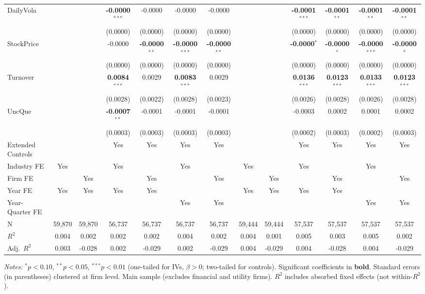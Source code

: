 \begin{landscape}
\begin{table}[H]
\begin{tabular}{lcccccccccccc}
DailyVola &  &  & \textbf{-0.0000}$^{***}$ & -0.0000 & -0.0000 & -0.0000 &  &  & \textbf{-0.0001}$^{***}$ & \textbf{-0.0001}$^{**}$ & \textbf{-0.0001}$^{**}$ & \textbf{-0.0001}$^{**}$ \\
 &  &  & (0.0000) & (0.0000) & (0.0000) & (0.0000) &  &  & (0.0000) & (0.0000) & (0.0000) & (0.0000) \\
StockPrice &  &  & -0.0000 & \textbf{-0.0000}$^{**}$ & \textbf{-0.0000}$^{***}$ & \textbf{-0.0000}$^{**}$ &  &  & \textbf{-0.0000}$^{*}$ & \textbf{-0.0000}$^{*}$ & \textbf{-0.0000}$^{***}$ & \textbf{-0.0000}$^{*}$ \\
 &  &  & (0.0000) & (0.0000) & (0.0000) & (0.0000) &  &  & (0.0000) & (0.0000) & (0.0000) & (0.0000) \\
Turnover &  &  & \textbf{0.0084}$^{***}$ & 0.0029 & \textbf{0.0083}$^{***}$ & 0.0029 &  &  & \textbf{0.0136}$^{***}$ & \textbf{0.0123}$^{***}$ & \textbf{0.0133}$^{***}$ & \textbf{0.0123}$^{***}$ \\
 &  &  & (0.0028) & (0.0022) & (0.0028) & (0.0023) &  &  & (0.0026) & (0.0028) & (0.0026) & (0.0028) \\
UncQue &  &  & \textbf{-0.0007}$^{**}$ & -0.0001 & -0.0001 & -0.0001 &  &  & -0.0003 & 0.0002 & 0.0001 & 0.0002 \\
 &  &  & (0.0003) & (0.0003) & (0.0003) & (0.0003) &  &  & (0.0002) & (0.0003) & (0.0002) & (0.0003) \\
\midrule
Extended Controls &  &  & Yes & Yes & Yes & Yes &  &  & Yes & Yes & Yes & Yes \\
Industry FE & Yes &  & Yes &  & Yes &  & Yes &  & Yes &  & Yes &  \\
Firm FE &  & Yes &  & Yes &  & Yes &  & Yes &  & Yes &  & Yes \\
Year FE & Yes & Yes & Yes & Yes &  &  & Yes & Yes & Yes & Yes &  &  \\
Year-Quarter FE &  &  &  &  & Yes & Yes &  &  &  &  & Yes & Yes \\
\midrule
N & 59,870 & 59,870 & 56,737 & 56,737 & 56,737 & 56,737 & 59,444 & 59,444 & 57,537 & 57,537 & 57,537 & 57,537 \\
$R^2$ & 0.004 & 0.002 & 0.002 & 0.002 & 0.004 & 0.002 & 0.004 & 0.001 & 0.005 & 0.003 & 0.005 & 0.002 \\
Adj.~$R^2$ & 0.003 & -0.028 & 0.002 & -0.029 & 0.002 & -0.029 & 0.004 & -0.029 & 0.004 & -0.028 & 0.004 & -0.029 \\
\bottomrule
\end{tabular}
\begin{minipage}{\linewidth}
\vspace{2pt}\scriptsize
\textit{Notes:} $^{*}p<0.10$, $^{**}p<0.05$, $^{***}p<0.01$ (one-tailed for IVs, $\beta > 0$; two-tailed for controls).
 Significant coefficients in \textbf{bold}.
 Standard errors (in parentheses) clustered at firm level.
 Main sample (excludes financial and utility firms).
 $R^2$ includes absorbed fixed effects (not within-$R^2$).
\end{minipage}
\end{table}
\end{landscape}